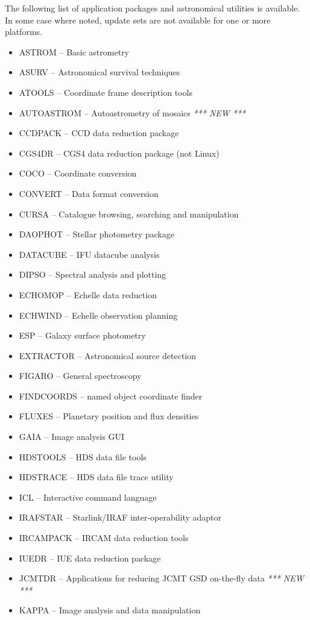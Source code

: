 \documentclass[twoside,11pt]{article}
\renewcommand{\_}{\texttt{\symbol{95}}}
\begin{document}
The following list of application packages and astronomical utilities
is available.  In some case where noted, update sets are not available for
one or more platforms.
\begin{itemize}
\item ASTROM -- Basic astrometry
\item ASURV -- Astronomical survival techniques
\item ATOOLS -- Coordinate frame description tools
\item AUTOASTROM -- Autoastrometry of mosaics \hfill \emph{*** NEW ***}
\item CCDPACK -- CCD data reduction package
\item CGS4DR -- CGS4 data reduction package (not Linux)
\item COCO -- Coordinate conversion
\item CONVERT -- Data format conversion
\item CURSA -- Catalogue browsing, searching  and manipulation
\item DAOPHOT -- Stellar photometry package
\item DATACUBE -- IFU datacube analysis
\item DIPSO -- Spectral analysis and plotting
\item ECHOMOP -- Echelle data reduction
\item ECHWIND -- Echelle observation planning
\item ESP -- Galaxy surface photometry
\item EXTRACTOR -- Astronomical source detection
\item FIGARO -- General spectroscopy
\item FINDCOORDS -- named object coordinate finder
\item FLUXES -- Planetary position and flux densities
\item GAIA -- Image analysis GUI
\item HDSTOOLS -- HDS data file tools
\item HDSTRACE -- HDS data file trace utility
\item ICL -- Interactive command language
\item IRAFSTAR -- Starlink/IRAF inter-operability adaptor
\item IRCAMPACK -- IRCAM data reduction tools
\item IUEDR -- IUE data reduction package
\item JCMTDR -- Applications for reducing JCMT GSD on-the-fly data \hfill \emph{*** NEW ***}
\item KAPPA -- Image analysis and data manipulation

\end{itemize}
\end{document}
